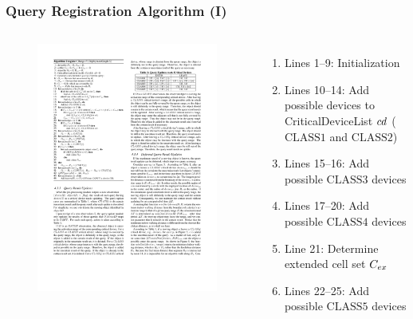 \begin{frame}
\frametitle{Query Registration Algorithm (I)}

\begin{columns}[c]

  \begin{figure}[tb]
    \includegraphics[width=\columnwidth]{figures/2-2/2-2-7.pdf}
  \end{figure}

\scriptsize{
  \begin{enumerate}
    \item Lines 1--9: \textrm{Initialization} \pause
    \item Lines 10--14: \textrm{Add possible devices to CriticalDeviceList $\mathnormal{cd}$ ($\mathrm{CLASS1}$ and $\mathrm{CLASS2}$)} \pause
    \item Lines 15--16: \textrm{Add possible $\mathrm{CLASS3}$ devices} \pause
    \item Lines 17--20: \textrm{Add possible $\mathrm{CLASS4}$ devices} \pause
    \item Line 21: \textrm{Determine extended cell set $\mathnormal{C_{ex}}$} \pause
    \item Lines 22--25: \textrm{Add possible $\mathrm{CLASS5}$ devices}
  \end{enumerate}
}
\end{columns}

\end{frame}


